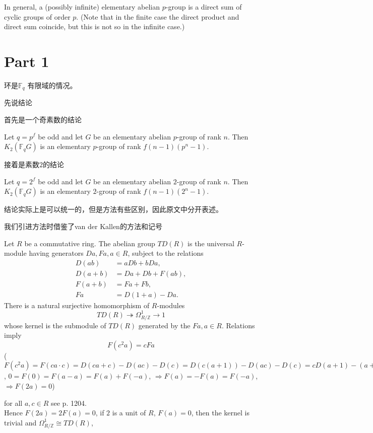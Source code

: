 In general, a (possibly infinite) elementary abelian $p$-group is a direct sum of cyclic groups of order $p$. (Note that in the finite case the direct product and direct sum coincide, but this is not so in the infinite case.)



\section{Part 1} %
\label{sec:第一部分}
环是$\mathbb{F}_q$ 有限域的情况。

先说结论

首先是一个奇素数的结论
\begin{prop}
\label{prop:podd}
	Let $q=p^f$ be odd and let $G$ be an elementary abelian $p$-group of rank $n$.
	Then $K_2(\mathbb{F}_qG)$ is an elementary $p$-group of rank $f(n-1)(p^n-1)$.
\end{prop}
接着是素数$2$的结论
\begin{prop}
	Let $q=2^f$ be odd and let $G$ be an elementary abelian $2$-group of rank $n$.
	Then $K_2(\mathbb{F}_qG)$ is an elementary $2$-group of rank $f(n-1)(2^n-1)$.
\end{prop}

结论实际上是可以统一的，但是方法有些区别，因此原文中分开表述。

我们引进方法时借鉴了van der Kallen的方法和记号

Let $R$ be a commutative ring. The abelian group  $TD(R)$  is the universal $R$-module having generators  $Da, Fa, a \in R$,  subject to the relations
\begin{align*}
D(ab) &= aDb + bDa,\\
D(a + b) &= Da + Db + F(ab),\\
F(a + b) &= Fa + Fb,\\
Fa  &= D(1  + a)- Da.
\end{align*}
There is a natural surjective homomorphism of $R$-modules
\[TD(R)\twoheadrightarrow \Omega^1_{R/\mathbb{Z}}\longrightarrow 1\]
whose kernel is the submodule of  $TD(R)$  generated by the  $Fa, a\in R$.  Relations
imply
\[
F(c^2a)=cFa
\]
($F(c^2a)=F(ca\cdot c)=D(ca+c)-D(ac)-D(c)=D(c(a+1))-D(ac)-D(c)=cD(a+1)-(a+1)D(c)-aD(c)-cD(a)-D(c)=cF(a)$, $0=F(0)=F(a-a)=F(a)+F(-a)$, $\Rightarrow F(a)=-F(a)=F(-a)$, $\Rightarrow F(2a)=0$)

for all  $a, c \in R$  see \cite{MR45:252}p. 1204. \\
Hence $F(2a)=2F(a)=0$, if $2$ is a unit of $R$, $F(a)=0$, then the kernel is trivial and $\Omega^1_{R/\mathbb{Z}}\cong  TD(R)$,

